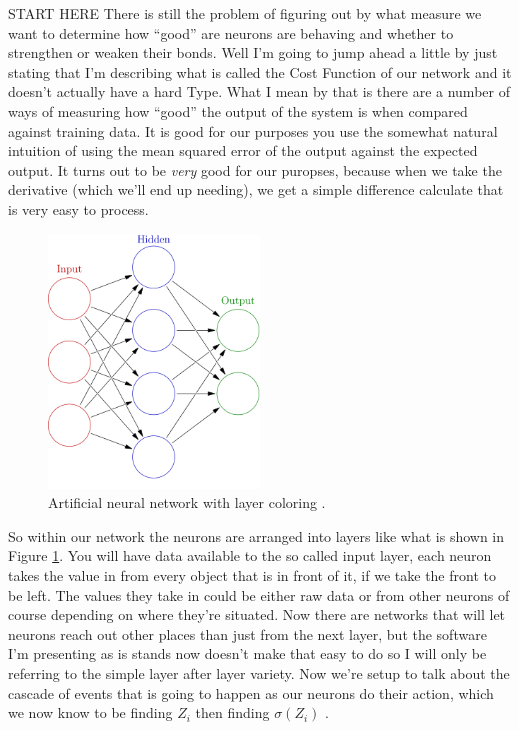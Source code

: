 \documentclass[a4paper,10pt]{article}
\begin{document}
\bigskip

START HERE
There is still the problem of figuring out by what
measure we want to determine how ``good'' are neurons are behaving and whether to strengthen or weaken their bonds. 
Well I'm going to jump ahead a little by just stating that I'm describing what is called the Cost Function of our
network and it doesn't actually have a hard Type.  What I mean by that is there are a number of ways of measuring how
``good'' the output of the system is when compared against training data. It is good for our purposes you use the
somewhat natural intuition of using the mean squared error of the output against the expected output.  It turns out to
be \textit{very} good for our puropses, because when we take the derivative (which we'll end up needing), we get a
simple difference calculate that is very easy to process.  

\begin{figure}[H] 
\centering
	\includegraphics[width=0.5\textwidth]{images/network.png}
	\caption{Artificial neural network with layer coloring \protect\cite{NetImg}. \protect\footnotemark}
	\label{fig:NetImg}
\end{figure} 


So within our network the neurons are arranged into layers like what is shown in Figure \ref{fig:NetImg}.  You will
have data available to the so called input layer, each neuron takes the value in from every object that is in
front of it, if we take the front to be left. The values they take in could be either raw data or from other neurons of
course depending on where they're situated.  Now there are networks that will let neurons reach out other places
than just from the next layer, but the software I'm presenting as is stands now doesn't make that easy to do so I will
only be referring to the simple layer after layer variety.  Now we're setup to talk about the
cascade of events that is going to happen as our neurons do their action, which we now know to be finding $Z_i$ then
finding $\sigma(Z_i)$ .
\end{document}
